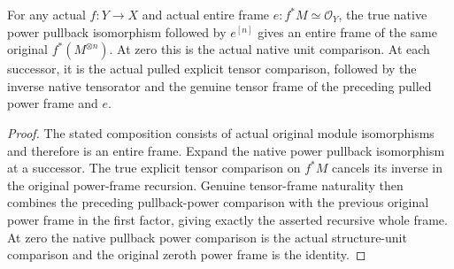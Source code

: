 \begin{definition}\label{def:fc-actual-pulled-power-frame}
\leanok
{}
For any actual $f:Y\to X$ and actual entire frame $e:f^*M\simeq
\mathcal O_Y$, the true native power pullback isomorphism followed
by $e^{[n]}$ gives an entire frame of the same original $f^*(M^{\otimes n})$.
At zero this is the actual native unit comparison. At each successor,
it is the actual pulled explicit tensor comparison, followed by
the inverse native tensorator and the genuine tensor frame of the
preceding pulled power frame and $e$.
\end{definition}
\begin{proof}
The stated composition consists of actual original module
isomorphisms and therefore is an entire frame. Expand the native
power pullback isomorphism at a successor. The true explicit tensor
comparison on $f^*M$ cancels its inverse in the original power-frame
recursion. Genuine tensor-frame naturality then combines the
preceding pullback-power comparison with the previous original
power frame in the first factor, giving exactly the asserted
recursive whole frame. At zero the native pullback power
comparison is the actual structure-unit comparison and the
original zeroth power frame is the identity.
\end{proof}

